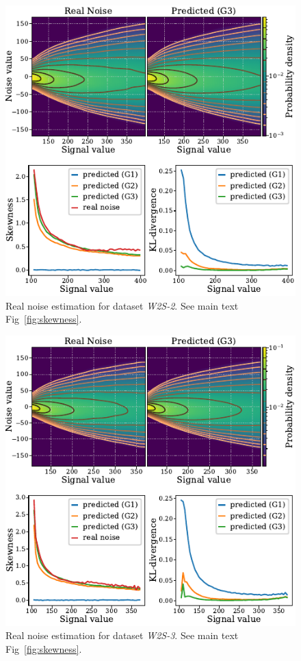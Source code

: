 \documentclass{article}
\begin{document}
\begin{figure}[ht]
\begin{center}
\centerline{\includegraphics[width=\columnwidth]{fig_skewness_w2s-2.pdf}}
\caption{Real noise estimation for dataset \textit{W2S-2}. See main text Fig~\ref{fig:skewness}.
}
\end{center}
\vskip -0.2in
\end{figure}

\begin{figure}[ht]
\begin{center}
\centerline{\includegraphics[width=\columnwidth]{fig_skewness_w2s-3.pdf}}
\caption{Real noise estimation for dataset \textit{W2S-3}. See main text Fig~\ref{fig:skewness}.
}
\end{center}
\vskip -0.2in
\end{figure}
\FloatBarrier
\end{document}
